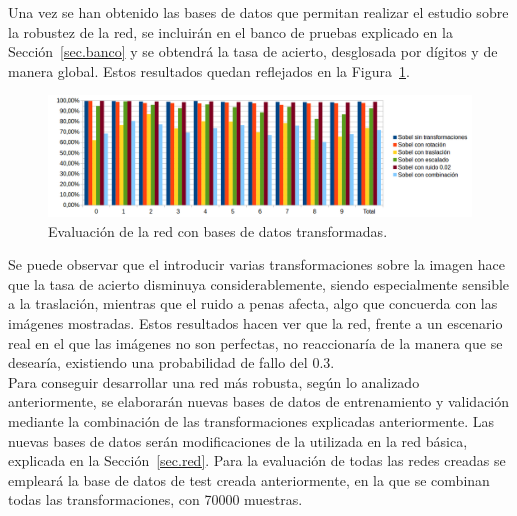 Una vez se han obtenido las bases de datos que permitan realizar el estudio sobre la robustez de la red, se incluirán en el banco de pruebas explicado en la Sección~\ref{sec.banco} y se obtendrá la tasa de acierto, desglosada por dígitos y de manera global. Estos resultados quedan reflejados en la Figura~\ref{fig.sobelEval}.

\begin{figure}[H]
	\begin{center}
		\includegraphics[width=1\textwidth]{figures/sobelev}
		\caption{Evaluación de la red con bases de datos transformadas.}
		\label{fig.sobelEval}
	\end{center}
\end{figure}

Se puede observar que el introducir varias transformaciones sobre la imagen hace que la tasa de acierto disminuya considerablemente, siendo especialmente sensible a la traslación, mientras que el ruido a penas afecta, algo que concuerda con las imágenes mostradas. Estos resultados hacen ver que la red, frente a un escenario real en el que las imágenes no son perfectas, no reaccionaría de la manera que se desearía, existiendo una probabilidad de fallo del 0.3.\\

Para conseguir desarrollar una red más robusta, según lo analizado anteriormente, se elaborarán nuevas bases de datos de entrenamiento y validación mediante la combinación de las transformaciones explicadas anteriormente. Las nuevas bases de datos serán modificaciones de la utilizada en la red básica, explicada en la Sección~\ref{sec.red}. Para la evaluación de todas las redes creadas se empleará la base de datos de test creada anteriormente, en la que se combinan todas las transformaciones, con 70000 muestras.\\

